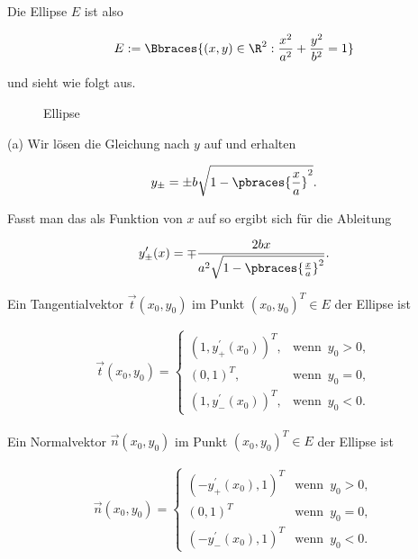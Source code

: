 \begin{solution}

Die Ellipse $E$ ist also

\begin{align*}
  E :=
  \Bbraces
  {
    (x, y) \in \R^2:
    \frac{x^2}{a^2} + \frac{y^2}{b^2} = 1
  }
\end{align*}

und sieht wie folgt aus.

\begin{figure}[h!]
  \centering
  
  \caption{Ellipse}
\end{figure}

(a) Wir lösen die Gleichung nach $y$ auf und erhalten

\begin{align*}
  y_\pm = \pm b \sqrt{1 - \pbraces{\frac{x}{a}}^2}.
\end{align*}

Fasst man das als Funktion von $x$ auf so ergibt sich für die Ableitung

\begin{align*}
  y^\prime_{\pm}(x)
  =
  \mp \frac{2bx}{a^2 \sqrt{1 - \pbraces{\frac{x}{a}}^2}}.
\end{align*}

Ein Tangentialvektor $\vec{t}(x_0, y_0)$ im Punkt $(x_0, y_0)^T \in E$ der Ellipse ist

\begin{align*}
  \vec{t}(x_0, y_0)
  =
  \begin{cases}
    (1, y_+^\prime(x_0))^T,
    & \text{wenn} \enspace y_0 > 0, \\
    (0, 1)^T,
    & \text{wenn} \enspace y_0 = 0, \\
    (1, y_-^\prime(x_0))^T,
    & \text{wenn} \enspace y_0 < 0.
  \end{cases}
\end{align*}

Ein Normalvektor $\vec{n}(x_0, y_0)$ im Punkt $(x_0, y_0)^T \in E$ der Ellipse ist

\begin{align*}
  \vec{n}(x_0, y_0)
  =
  \begin{cases}
    (-y_+^\prime(x_0), 1)^T
    & \text{wenn} \enspace y_0 > 0, \\
    (0, 1)^T
    & \text{wenn} \enspace y_0 = 0, \\
    (-y_-^\prime(x_0), 1)^T
    & \text{wenn} \enspace y_0 < 0.
  \end{cases}
\end{align*}


\end{solution}

